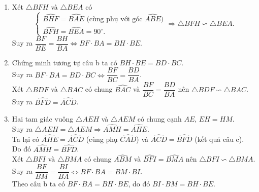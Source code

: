 \begin{ex}
{\begin{enumerate}
$$\begin{cases}
			\widehat{FHB} =\widehat{EHC} \text{ (hai góc đối đỉnh)}\\
			\widehat{HFB} = \widehat{HEC} \text{ (hai góc vuông)}
			\end{cases}  \Rightarrow \triangle HBF \backsim \triangle HCE.$$
			\item Xét $\triangle BFH$ và $\triangle BEA$ có 
			$$\begin{cases}
			\widehat{BHF} =\widehat{BAE} \text{ (cùng phụ với góc }\widehat{ABE})\\
			\widehat{BFH} =\widehat{BEA} =90^\circ.
			\end{cases} \Rightarrow \triangle BFH \backsim \triangle BEA.$$ Suy ra $\dfrac{BF}{BE}=\dfrac{BH}{BA} \Leftrightarrow BF \cdot BA =BH \cdot BE$.
			\item Chứng minh tương tự câu b ta có $BH \cdot BE =BD \cdot BC$. 
			\\ Suy ra $BF \cdot BA =BD \cdot BC \Leftrightarrow \dfrac{BF}{BC} =\dfrac{BD}{BA}$.
			\\ Xét $\triangle BDF$ và $\triangle BAC$ có
			chung $\widehat{BAC}$ và $\dfrac{BF}{BC} =\dfrac{BD}{BA}$ nên $\triangle BDF \backsim \triangle BAC$.
			\\ Suy ra $\widehat{BFD} =\widehat{ACD}$.
			\item Hai tam giác vuông $\triangle AEH$ và $\triangle AEM$ có chung cạnh $AE$, $EH=HM$.
			\\ Suy ra $\triangle AEH =\triangle AEM \Rightarrow \widehat{AMH} =\widehat{AHE}$.
			\\ Ta lại có $\widehat{AHE} =\widehat{ACD}$ (cùng phụ $\widehat{CAD}$) và $\widehat{ACD} =\widehat{BFD}$ (kết quả câu c). 
			\\ Do đó $\widehat{AMH}=\widehat{BFD}$.
			\\ Xét $\triangle BFI$ và $\triangle BMA$ có chung $\widehat{ABM}$ và $\widehat{BFI} =\widehat{BMA}$ nên $\triangle BFI \backsim \triangle BMA$.
			\\ Suy ra $\dfrac{BF}{BM}=\dfrac{BI}{BA} \Leftrightarrow BF \cdot BA =BM \cdot BI$.
			\\ Theo câu b ta có $BF \cdot BA =BH \cdot BE$, do đó $BI\cdot BM = BH \cdot BE$.
		\end{enumerate}
	}
\end{ex}
